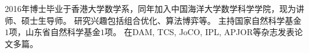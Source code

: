 %
%

\par{
\fontsize{9.65pt}{\baselineskip}\selectfont
2016年博士毕业于香港大学数学系，同年加入中国海洋大学数学科学学院，现为讲师、硕士生导师。
研究兴趣包括组合优化、算法博弈等。
主持国家自然科学基金$1$项，山东省自然科学基金$1$项。
在DAM, TCS, JoCO, IPL, APJOR等杂志发表论文多篇。
}